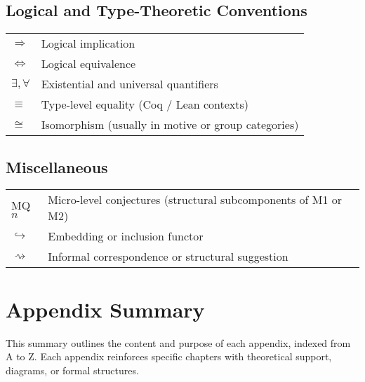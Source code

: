 \documentclass[11pt]{article}
\begin{document}
\vspace{1em}

\subsection*{Logical and Type-Theoretic Conventions}

\begin{tabular}{ll}
$\Rightarrow$ & Logical implication \\
$\iff$ & Logical equivalence \\
$\exists, \forall$ & Existential and universal quantifiers \\
$\equiv$ & Type-level equality (Coq / Lean contexts) \\
$\cong$ & Isomorphism (usually in motive or group categories) \\
\end{tabular}

\vspace{1em}

\subsection*{Miscellaneous}

\begin{tabular}{ll}
MQ$n$ & Micro-level conjectures (structural subcomponents of M1 or M2) \\
$\hookrightarrow$ & Embedding or inclusion functor \\
$\rightsquigarrow$ & Informal correspondence or structural suggestion \\
\end{tabular}

\FloatBarrier



\section*{Appendix Summary}

This summary outlines the content and purpose of each appendix, indexed from A to Z. Each appendix reinforces specific chapters with theoretical support, diagrams, or formal structures.
\end{document}
